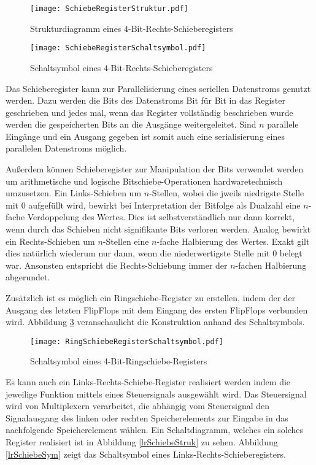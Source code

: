 \begin{figure}[htp]
	\centering
	\texttt{[image: SchiebeRegisterStruktur.pdf]}
	\caption{Strukturdiagramm eines 4-Bit-Rechts-Schieberegisters}
	\label{Bit4SchiebRegStruk}
\end{figure}

\begin{figure}[htp]
	\centering
	\texttt{[image: SchiebeRegisterSchaltsymbol.pdf]}
	\caption{Schaltsymbol eines 4-Bit-Rechts-Schieberegisters}
	\label{Bit4SchiebRegScha}
\end{figure}

Das Schieberegister kann zur Parallelisierung eines seriellen Datenstroms genutzt werden. Dazu werden die Bits des Datenstroms Bit für Bit in das Register geschrieben und jedes mal, wenn das Register vollständig beschrieben wurde werden die gespeicherten Bits an die Ausgänge weitergeleitet. Sind $n$ parallele Eingänge und ein Ausgang gegeben ist somit auch eine serialisierung eines parallelen Datenstroms möglich.

Außerdem können Schieberegister zur Manipulation der Bits verwendet werden um arithmetische und logische Bitschiebe-Operationen hardwaretechnisch umzusetzen. Ein Links-Schieben um $n$-Stellen, wobei die jweils niedrigste Stelle mit 0 aufgefüllt wird, bewirkt bei Interpretation der Bitfolge als Dualzahl eine $n$-fache Verdoppelung des Wertes. Dies ist selbstverständlich nur dann korrekt, wenn durch das Schieben nicht signifikante Bits verloren werden. Analog bewirkt ein Rechts-Schieben um $n$-Stellen eine $n$-fache Halbierung des Wertes. Exakt gilt dies natürlich wiederum nur dann, wenn die niederwertigste Stelle mit 0 belegt war. Ansonsten entspricht die Rechts-Schiebung immer der $n$-fachen Halbierung abgerundet. 

Zusätzlich ist es möglich ein Ringschiebe-Register zu erstellen, indem der der Ausgang des letzten FlipFlops mit dem Eingang des ersten FlipFlops verbunden wird. Abbildung \ref{ringSchiebe} veranschaulicht die Konstruktion anhand des Schaltsymbols.

\begin{figure}[htp]
	\centering
	\texttt{[image: RingSchiebeRegisterSchaltsymbol.pdf]}
	\caption{Schaltsymbol eines 4-Bit-Ringschiebe-Registers}
	\label{ringSchiebe}
\end{figure}

Es kann auch ein Links-Rechts-Schiebe-Register realisiert werden indem die jeweilige Funktion mittels eines Steuersignals ausgewählt wird. Das Steuersignal wird von Multiplexern verarbeitet, die abhängig vom Steuersignal den Signalausgang des linken oder rechten Speicherelements zur Eingabe in das nachfolgende Speicherelement wählen. Ein Schaltdiagramm, welches ein solches Register realisiert ist in Abbildung \ref{lrSchiebeStruk} zu sehen. Abbildung \ref{lrSchiebeSym} zeigt das Schaltsymbol eines Links-Rechts-Schieberegisters.

